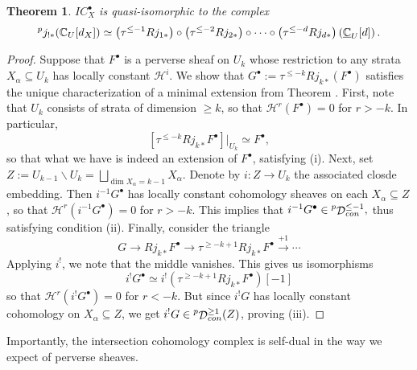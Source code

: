 \documentclass[12pt]{amsart}
\newcommand{\C}{\mathbb{C}}
\DeclareMathOperator{\D}{\mathcal{D}}
\newcommand{\sH}{\mathscr{H}}
\newtheorem{theorem}{Theorem}[section]
\theoremstyle{definition}
\theoremstyle{remark}
\numberwithin{equation}{section}
\begin{document}
\begin{theorem} \label{ic-structure}
    \(IC_X^{\bullet}\) is quasi-isomorphic to the complex
    \begin{equation}
        \prescript{p}{}{j_{!*}}(\C_U[d_X]) \simeq 
        \left(\tau^{\leq -1}Rj_{1*}\right) \circ \left(\tau^{\leq -2}Rj_{2*}\right)
        \circ \cdots \circ \left(\tau^{\leq -d}Rj_{d*}\right)
        \left(\underline{\C}_U[d]\right).
    \end{equation}
\end{theorem}
\begin{proof}
Suppose that $F^\bullet$ is a perverse sheaf on $U_k$ whose restriction to 
any strata $X_\alpha \subseteq U_k$ has locally constant $\sH^i$.
We show that $G^\bullet := \tau^{\leq -k} Rj_{k*}(F^\bullet)$ satisfies the
unique characterization of a minimal extension from Theorem 
. First, note that $U_k$ consists of 
strata of dimension $\geq k$, so that \(\sH^r(F^\bullet)  = 0\) for 
\(r > -k\). In particular,
\begin{equation*}
    \left[\tau^{\leq -k} Rj_{k*} F^\bullet\right]|_{U_k} \simeq F^\bullet,
\end{equation*}
so that what we have is indeed an extension of $F^\bullet$, satisfying (i).
Next, set \(Z := U_{k-1} \smallsetminus U_k = 
\bigsqcup_{\dim X_\alpha = k-1} X_\alpha\). Denote by $i: Z \to U_k$ the
associated closde embedding. Then $i^{-1} G^\bullet$ has locally constant 
cohomology sheaves on each $X_\alpha \subseteq Z$, so that 
\(\sH^r(i^{-1} G^\bullet) = 0\) for \(r > -k\). This implies that 
\(i^{-1} G^\bullet \in \prescript{p}{}{\D}_{con}^{\leq -1},\) thus satisfying
condition (ii). Finally, consider the triangle
\begin{equation}
    G \to Rj_{k*} F^\bullet \to \tau^{\geq -k+1} Rj_{k*} F^\bullet
    \overset{+1}{\to} \cdots
\end{equation}
Applying $i^!$, we note that the middle vanishes. This gives us isomorphisms
\begin{equation*}
    i^! G^\bullet \simeq i^! (\tau^{\geq -k+1} Rj_{k*} F^\bullet)[-1]
\end{equation*}
so that $\sH^r(i^! G^\bullet) = 0$ for \(r < -k\). But since \(i^! G\) has locally
constant cohomology on \(X_\alpha \subseteq Z\), we get
\(i^! G \in \prescript{p}{}{\D}_{con}^{\geq 1}(Z)\), proving (iii).
\end{proof}

Importantly, the intersection cohomology complex is self-dual in the way we expect of perverse sheaves.
\end{document}
